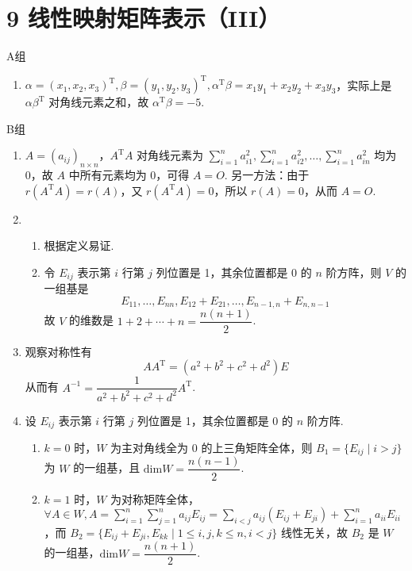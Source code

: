 \section*{9 线性映射矩阵表示（III）}

\vspace{2ex}

\centerline{\heiti A组}
\begin{enumerate}
    \item $\alpha = (x_1,x_2,x_3)^{\mathrm{T}},\beta = (y_1,y_2,y_3)^{\mathrm{T}},\alpha^{\mathrm{T}}\beta=x_1y_1+x_2y_2+x_3y_3$，实际上是 $\alpha\beta^{\mathrm{T}}$ 对角线元素之和，故 $\alpha^{\mathrm{T}}\beta=-5$.
\end{enumerate}

\centerline{\heiti B组}
\begin{enumerate}
    \item $A=(a_{ij})_{n\times n}$，$A^\mathrm{T}A$ 对角线元素为 $\displaystyle\sum_{i=1}^na_{i1}^2,\sum_{i=1}^na_{i2}^2,\ldots,\sum_{i=1}^na_{in}^2$ 均为 0，故 $A$ 中所有元素均为 0，可得 $A=O$. 另一方法：由于 $r(A^\mathrm{T}A) = r(A)$，又 $r(A^\mathrm{T}A)=0$，所以 $r(A)=0$，从而 $A=O$.

    \item \begin{enumerate}
              \item 根据定义易证.

              \item 令 $E_{ij}$ 表示第 $i$ 行第 $j$ 列位置是 1，其余位置都是 0 的 $n$ 阶方阵，则 $V$ 的一组基是
                    \[E_{11},\ldots,E_{nn},E_{12}+E_{21},\ldots,E_{n-1,n}+E_{n,n-1}\]
                    故 $V$ 的维数是 $1+2+\cdots+n=\dfrac{n(n+1)}{2}$.
          \end{enumerate}

    \item 观察对称性有
          \[AA^{\mathrm{T}}=(a^2+b^2+c^2+d^2)E\]
          从而有 $A^{-1}=\dfrac{1}{a^2+b^2+c^2+d^2}A^{\mathrm{T}}$.

    \item 设 $E_{ij}$ 表示第 $i$ 行第 $j$ 列位置是 1，其余位置都是 0 的 $n$ 阶方阵.
          \begin{enumerate}
              \item $k=0$ 时，$W$ 为主对角线全为 0 的上三角矩阵全体，则 $B_1=\{E_{ij} \mid i>j\}$ 为 $W$ 的一组基，且 $\mathrm{dim}W=\dfrac{n(n-1)}{2}$.

              \item $k=1$ 时，$W$ 为对称矩阵全体，$\forall A\in W,A = \displaystyle\sum_{i=1}^n\sum_{j=1}^na_{ij}E_{ij}=\sum_{i<j}a_{ij}(E_{ij}+E_{ji})+\sum_{i=1}^na_{ii}E_{ii}$，而 $B_2=\{E_{ij}+E_{ji},E_{kk} \mid 1\leq i,j,k\leq n,i<j\}$ 线性无关，故 $B_2$ 是 $W$ 的一组基，$\mathrm{dim}W=\dfrac{n(n+1)}{2}$.


\end{enumerate}
\end{enumerate}

